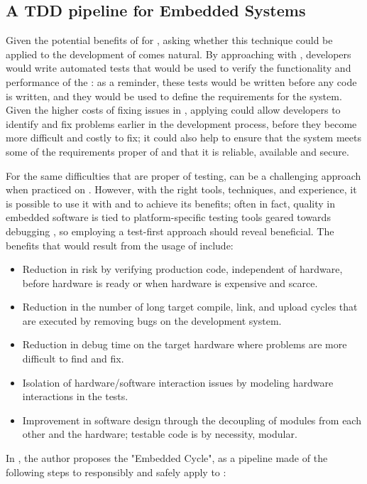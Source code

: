 \subsection{A TDD pipeline for Embedded Systems}
Given the potential benefits of \tdd for \noess, asking whether this technique could be applied to the development of \ess comes natural. By approaching \es with \tdd, developers would write automated tests that would be used to verify the functionality and performance of the \es: as a reminder, these tests would be written before any code is written, and they would be used to define the requirements for the system. 
Given the higher costs of fixing issues in \ess, applying \tdd could allow developers to identify and fix problems earlier in the development process, before they become more difficult and costly to fix; it could also help to ensure that the system meets some of the requirements proper of \ess and that it is reliable, available and secure.

For the same difficulties that are proper of \es testing, \tdd can be a challenging approach when practiced on \ess. However, with the right tools, techniques, and experience, it is possible to use it with and to achieve its benefits; often in fact, quality in embedded software is tied to platform-specific testing tools geared towards debugging \cite{TDDEmbeddedSoftware}, so employing a test-first approach should reveal beneficial.
The benefits that would result from the usage of \tdd include:
\begin{itemize}
    \item Reduction in risk by verifying production code, independent of hardware, before hardware is ready or when hardware is expensive and scarce.
    \item Reduction in the number of long target compile, link, and upload cycles that are executed by removing bugs on the development system.
    \item Reduction in debug time on the target hardware where problems are more difficult to find and fix.
    \item Isolation of hardware/software interaction issues by modeling hardware interactions in the tests.
    \item Improvement in software design through the decoupling of modules from each other and the hardware; testable code is by necessity, modular.
\end{itemize}


\noindent In \cite{TDDEC}, the author proposes the "Embedded \tdd Cycle", as a pipeline made of the following steps to responsibly and safely apply \tdd to \ess:


